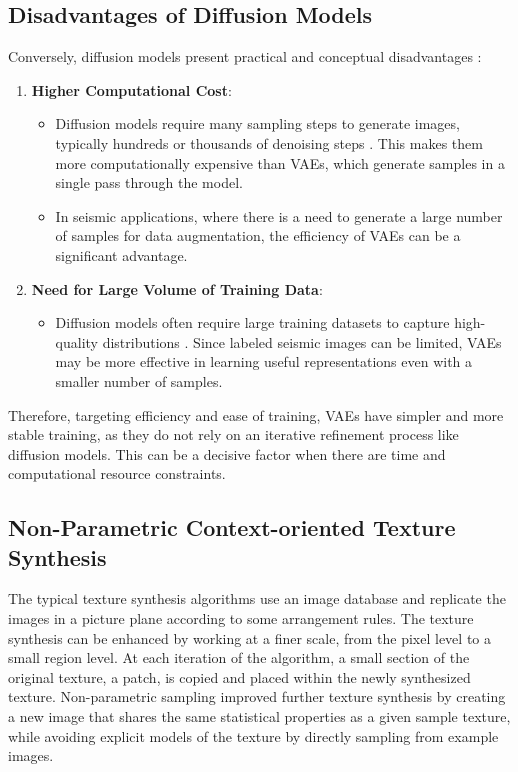 \documentclass{ieeeaccess}
\begin{document}
\subsection*{Disadvantages of Diffusion Models}
Conversely, diffusion models present practical and conceptual disadvantages \cite{ref17}:
\begin{enumerate}
    \item \textbf{Higher Computational Cost}:
    \begin{itemize}
        \item Diffusion models require many sampling steps to generate images, typically hundreds or thousands of denoising steps \cite{ref17}. This makes them more computationally expensive than VAEs, which generate samples in a single pass through the model.
        \item In seismic applications, where there is a need to generate a large number of samples for data augmentation, the efficiency of VAEs can be a significant advantage. 
    \end{itemize}
    \item \textbf{Need for Large Volume of Training Data}:
    \begin{itemize}
        \item Diffusion models often require large training datasets to capture high-quality distributions  \cite{ref17}. Since labeled seismic images can be limited, VAEs may be more effective in learning useful representations even with a smaller number of samples.
    \end{itemize}
\end{enumerate}

Therefore, targeting efficiency and ease of training, VAEs have simpler and more stable training, as they do not rely on an iterative refinement process like diffusion models. This can be a decisive factor when there are time and computational resource constraints.



\subsection{Non-Parametric Context-oriented Texture Synthesis}

The typical texture synthesis algorithms use an image database and replicate the images in a picture plane according to some arrangement rules. The texture synthesis can be enhanced by working at a finer scale, from the pixel level to a small region level. At each iteration of the algorithm, a small section of the original texture, a patch, is copied and placed within the newly synthesized texture. Non-parametric sampling \cite{ref12} improved further texture synthesis by creating a new image that shares the same statistical properties as a given sample texture, while avoiding explicit models of the texture by directly sampling from example images.
\end{document}

